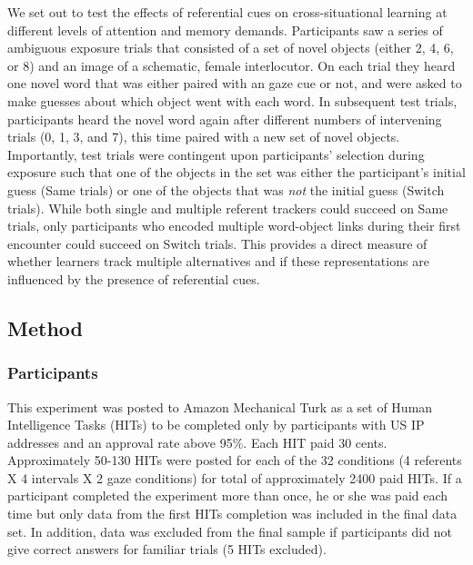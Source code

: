 \documentclass[12pt,]{article}
\begin{document}
We set out to test the effects of referential cues on cross-situational
learning at different levels of attention and memory demands.
Participants saw a series of ambiguous exposure trials that consisted of
a set of novel objects (either 2, 4, 6, or 8) and an image of a
schematic, female interlocutor. On each trial they heard one novel word
that was either paired with an gaze cue or not, and were asked to make
guesses about which object went with each word. In subsequent test
trials, participants heard the novel word again after different numbers
of intervening trials (0, 1, 3, and 7), this time paired with a new set
of novel objects. Importantly, test trials were contingent upon
participants' selection during exposure such that one of the objects in
the set was either the participant's initial guess (Same trials) or one
of the objects that was \emph{not} the initial guess (Switch trials).
While both single and multiple referent trackers could succeed on Same
trials, only participants who encoded multiple word-object links during
their first encounter could succeed on Switch trials. This provides a
direct measure of whether learners track multiple alternatives and if
these representations are influenced by the presence of referential
cues.

\subsection{Method}\label{method}

\subsubsection{Participants}\label{participants}

This experiment was posted to Amazon Mechanical Turk as a set of Human
Intelligence Tasks (HITs) to be completed only by participants with US
IP addresses and an approval rate above 95\%. Each HIT paid 30 cents.
Approximately 50-130 HITs were posted for each of the 32 conditions (4
referents X 4 intervals X 2 gaze conditions) for total of approximately
2400 paid HITs. If a participant completed the experiment more than
once, he or she was paid each time but only data from the first HITs
completion was included in the final data set. In addition, data was
excluded from the final sample if participants did not give correct
answers for familiar trials (5 HITs excluded).
\end{document}
